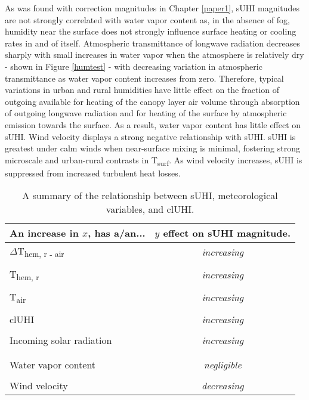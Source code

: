 As was found with correction magnitudes in Chapter \ref{paper1}, sUHI magnitudes are not strongly correlated with water vapor content as, in the absence of fog, humidity near the surface does not strongly influence surface heating or cooling rates in and of itself. Atmospheric transmittance of longwave radiation decreases sharply with small increases in water vapor when the atmosphere is relatively dry - shown in Figure \ref{humtest} - with decreasing variation in atmospheric transmittance as water vapor content increases from zero. Therefore, typical variations in urban and rural humidities have little effect on the fraction of outgoing available for heating of the canopy layer air volume through absorption of outgoing longwave radiation and for heating of the surface by atmospheric emission towards the surface. As a result, water vapor content has little effect on sUHI. Wind velocity displays a strong negative relationship with sUHI. sUHI is greatest under calm winds when near-surface mixing is minimal, fostering strong microscale and urban-rural contrasts in T\textsubscript{surf}. As wind velocity increases, sUHI is suppressed from increased turbulent heat losses.

\begin{table}[H]
	\centering
	\caption{A summary of the relationship between sUHI, meteorological variables, and clUHI.}
	\label{meteo_cont}
	\begin{tabular}{lc}
		\toprule 
		An increase in $x$, has a/an... & $y$ effect on sUHI magnitude. \\
		\midrule
		$\Delta$T\textsubscript{hem, r - air} &\textit{increasing} \\
		&\\
		T\textsubscript{hem, r} & \textit{increasing} \\
		&\\
		T\textsubscript{air} & \textit{increasing} \\
		&\\
		clUHI &\textit{increasing} \\
		&\\
		Incoming solar radiation & \textit{increasing}  \\
		& \\
		& \\
		Water vapor content & \textit{negligible} \\
	 	&\\
		Wind velocity &\textit{decreasing} \\
		\bottomrule
	\end{tabular} 
\end{table}

